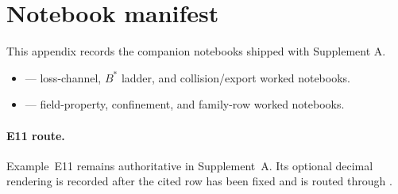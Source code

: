 \section{Notebook manifest}
This appendix records the companion notebooks shipped with Supplement A.\par
\begin{itemize}
\item {} --- loss-channel, $B^*$ ladder, and collision/export worked notebooks.
\item {} --- field-property, confinement, and family-row worked notebooks.
\end{itemize}
\paragraph{E11 route.} Example~E11 remains authoritative in Supplement~A. Its optional decimal rendering is recorded after the cited row has been fixed and is routed through .
